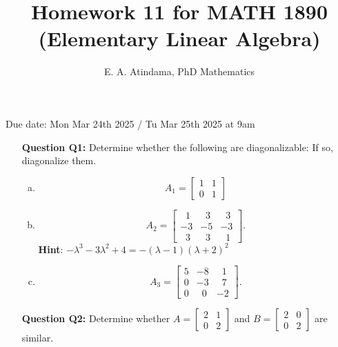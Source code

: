 \documentclass[a4paper,11pt,reqno]{amsart}
\title[MATH 1890 (Elementary Linear Algebra)]{Homework 11 for MATH 1890 (Elementary Linear Algebra)}
\author[Emmanuel Atindama]{E. A. Atindama, PhD Mathematics}
\numberwithin{equation}{section}
\begin{document}
\maketitle
Due date: Mon Mar 24th 2025 / Tu Mar 25th 2025 at 9am
\vspace{0.5cm}

\begin{enumerate}
    \item[\textbf{Question Q1:}] 
    Determine whether the following are diagonalizable: If so, diagonalize them.
    \begin{enumerate}[a)]
        \item \[A_1 =\begin{bmatrix} 1 & 1\\ 0 & 1 \end{bmatrix}\]

        \item \[ A_2 = \begin{bmatrix}
            \;\;1 & \;\;3 &\;\; 3 \\
            -3 & -5 & -3 \\
            \;\;3 & \;\;3 & \;\;1
            \end{bmatrix}.\]
            \textbf{Hint}:  \( -\lambda^3 -3\lambda^2 + 4 = -(\lambda-1)(\lambda+2)^2\)
    
        \item \[A_3 = \begin{bmatrix}
            5 & -8 &\;\; 1 \\
            0 & -3 & \;\;7 \\
            0 & \;\;0 & -2
    \end{bmatrix}.\] 
    \end{enumerate}

    \item[\textbf{Question Q2:}]
    Determine whether
    \(A =\begin{bmatrix} 2 & 1\\ 0 & 2 \end{bmatrix}\) and 
    \(B =\begin{bmatrix} 2 & 0\\ 0 & 2 \end{bmatrix}\) are similar.
    
\end{enumerate}





\end{document}

